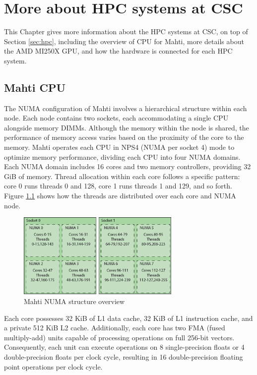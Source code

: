 \chapter{More about HPC systems at CSC}
This Chapter gives more information about the HPC systems at CSC, on top of Section \ref{sec:hpc}, including the overview of CPU for Mahti, more details about the AMD MI250X GPU, and how the hardware is connected for each HPC system.

\section{Mahti CPU}
The NUMA configuration of Mahti \cite{mahti} involves a hierarchical structure within each node. Each node contains two sockets, each accommodating a single CPU alongside memory DIMMs. Although the memory within the node is shared, the performance of memory access varies based on the proximity of the core to the memory. Mahti operates each CPU in NPS4 (NUMA per socket 4) mode to optimize memory performance, dividing each CPU into four NUMA domains. Each NUMA domain includes 16 cores and two memory controllers, providing 32 GiB of memory. Thread allocation within each core follows a specific pattern: core 0 runs threads 0 and 128, core 1 runs threads 1 and 129, and so forth. Figure \ref{fig_mahti_numa} shows how the threads are distributed over each core and NUMA node.

\begin{figure}[H]
    \centering
    \includegraphics[width=0.7\textwidth]{figures/mahti_numa.png}
    \caption{Mahti NUMA structure overview \cite{mahti}}
    \label{fig_mahti_numa}
\end{figure}

Each core possesses 32 KiB of L1 data cache, 32 KiB of L1 instruction cache, and a private 512 KiB L2 cache. Additionally, each core has two FMA (fused multiply-add) units capable of processing operations on full 256-bit vectors. Consequently, each unit can execute operations on 8 single-precision floats or 4 double-precision floats per clock cycle, resulting in 16 double-precision floating point operations per clock cycle.

